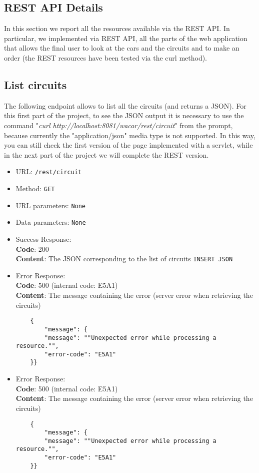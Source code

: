 \subsection{REST API Details}

In this section we report all the resources available via the REST API. In particular, we implemented via REST API, all the parts of the web application that allows the final user to look at the cars and the circuits and to make an order (the REST resources have been tested via the curl method).

\subsection*{List circuits}

The following endpoint allows to list all the circuits (and returns a JSON). For this first part of the project, to see the JSON output it is necessary to use the command "\textit{curl http://localhost:8081/wacar/rest/circuit}" from the prompt, because currently the "application/json" media type is not supported. In this way, you can still check the first version of the page implemented with a servlet, while in the next part of the project we will complete the REST version.

\begin{itemize}
    \item URL: \texttt{/rest/circuit}
    \item Method: \texttt{GET}
    \item URL parameters: \texttt{None}
    \item Data parameters: \texttt{None}
    \item Success Response: \\
        \textbf{Code}: 200\\
        \textbf{Content}: The JSON corresponding to the list of circuits
        \texttt{INSERT JSON}
    \item Error Response:\\
    \textbf{Code}: 500 (internal code: E5A1)\\
    \textbf{Content}: The message containing the error (server error when retrieving the circuits)\\
    \begin{verbatim}
    {
        "message": {
        "message": ""Unexpected error while processing a resource."",
        "error-code": "E5A1"
    }}
    \end{verbatim}
    \item Error Response:\\
    \textbf{Code}: 500 (internal code: E5A1)\\
    \textbf{Content}: The message containing the error (server error when retrieving the circuits)\\
    \begin{verbatim}
    {
        "message": {
        "message": ""Unexpected error while processing a resource."",
        "error-code": "E5A1"
    }}
    \end{verbatim}
    
\end{itemize}

